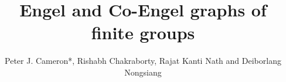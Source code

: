 \documentclass[reqno,12pt]{amsart}
\theoremstyle{plain}
\theoremstyle{definition}
\begin{document}
\title[Engel and co-Engel graphs]{Engel and Co-Engel graphs of finite groups}

\author[P. J. Cameron, R. Chakraborty,  R. K. Nath and D. Nongsiang]{Peter J. Cameron*, Rishabh Chakraborty, Rajat Kanti Nath and Deiborlang Nongsiang}

\address{P. J. Cameron, School of Mathematics and Statistics, University of St Andrews, North Haugh, St Andrews, Fife, KY16 9SS, UK.}


\address{R. Chakraborty, Department of Mathematical Sciences, Tezpur University, Napaam-784028, Sonitpur, Assam, India. \,\,
Department of Mathematics, Assam Engineering Institute, Chandmari, Guwahati-781003, Assam, India.}


\address{R. K. Nath, Department of Mathematical Sciences, Tezpur University, Napaam-784028, Sonitpur, Assam, India.}


\address{D. Nongsiang, Department of Mathematics, North-Eastern Hill University,
	Shillong-793022, Meghalaya, India.}

\end{document}
